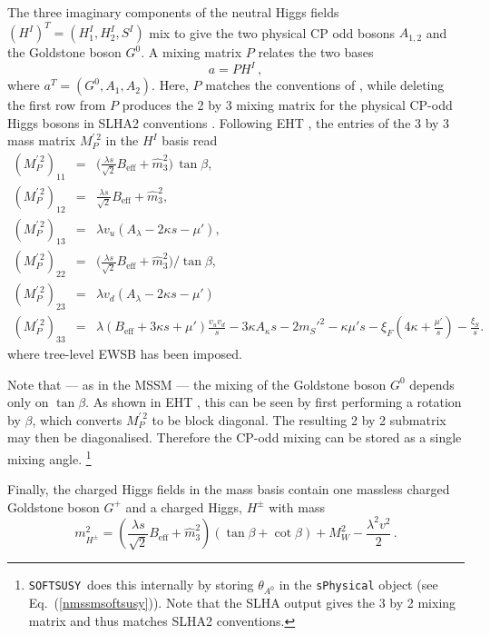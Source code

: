 \documentclass[final,3p,times,pdflatex]{elsarticle}
\def\SOFTSUSY{{\tt SOFTSUSY}}
\newcommand{\be}{\begin{equation}}
\newcommand{\ee}{\end{equation}}
\newcommand{\ba}{\begin{eqnarray}}
\newcommand{\ea}{\end{eqnarray}}
\newcommand{\ds}{\displaystyle}
\begin{document}
The three imaginary components of the neutral Higgs fields 
$(H^I)^T = (H^I_1, H_2^I, S^I)$ mix to give the two physical CP odd bosons 
$A_{1,2}$ and the Goldstone boson $G^0$.  A mixing matrix $P$ relates the two 
bases
%
\be 
a = P H^I\,, 
\ee
%
where $a^T = (G^0,A_1,A_2)$.  Here, $P$ matches the conventions of 
\cite{Degrassi:2009yq}, while deleting the first row from $P$ produces the 2 by
 3 mixing matrix for the physical CP-odd Higgs bosons in SLHA2 conventions \cite{Allanach:2008qq}. Following EHT \cite{Ellwanger:2009dp}, the entries of the 
3 by 3 mass matrix $ M^{\prime \, 2}_{P}$ in the $H^I$ basis read
%
\ba
( M^{\prime \, 2}_{P})_{11} & = & \Bigg(\ds\frac{\lambda s}{\sqrt{2}} B_\textrm{eff} +
\widehat{m}_3^2\Bigg)\,\tan\beta , \\
( M^{\prime \, 2}_{P})_{12} & = & \ds\frac{\lambda s}{\sqrt{2}} B_\textrm{eff} +
\widehat{m}_3^2, \\
( M^{\prime \, 2}_{P})_{13} & = & \lambda v_u (A_\lambda - 2\kappa s - \mu'), \\
( M^{\prime \, 2}_{P})_{22} & = & \Bigg(\ds\frac{\lambda s}{\sqrt{2}} B_\textrm{eff} +
\widehat{m}_3^2\Bigg)/\tan\beta ,  \\
( M^{\prime \, 2}_{P})_{23} & = & \lambda v_d (A_\lambda - 2\kappa s - \mu')\\
( M^{\prime \, 2}_{P})_{33} & = & \lambda (B_\textrm{eff}+3\kappa s +\mu')\ds\frac{v_u
v_d}{s} -3\kappa A_\kappa s  -2 m_{S}'^2 -\kappa \mu' s 
-\xi_F\left(4\kappa + \frac{\mu'}{s}\right) -\ds\frac{\xi_S}{s}.
\label{eq:MA0}
\ea
%
where tree-level EWSB has been imposed.

Note that --- as in the MSSM --- the mixing of the Goldstone boson $G^0$ depends
 only on $\tan\beta$. As shown in EHT \cite{Ellwanger:2009dp}, this can be seen 
by first performing a rotation by $\beta$, which converts $M^{\prime\, 2}_P$ to be 
block diagonal.  The resulting 2 by 2 submatrix may then be diagonalised. 
Therefore the CP-odd mixing can be stored as a single mixing angle.%
  \footnote{\SOFTSUSY~does this internally by storing $\theta_{A^0}$ in the 
    {\tt sPhysical} object (see Eq.~(\ref{nmssmsoftsusy})).  Note that the
    SLHA output 
    gives the 3 by 2 mixing matrix and thus matches SLHA2 conventions.}

Finally, the charged Higgs fields in the mass basis contain one massless 
charged Goldstone boson $G^+$ and a charged Higgs, $H^\pm$ with mass
%
\be 
m_{H^\pm}^2 = \left(\ds\frac{\lambda s}{\sqrt{2}} B_\textrm{eff} +
\widehat{m}_3^2\right)(\tan \beta + \cot \beta) + M_W^2 - \ds\frac{\lambda^2 v^2}{2}\,. 
%
\ee
  
\end{document}
